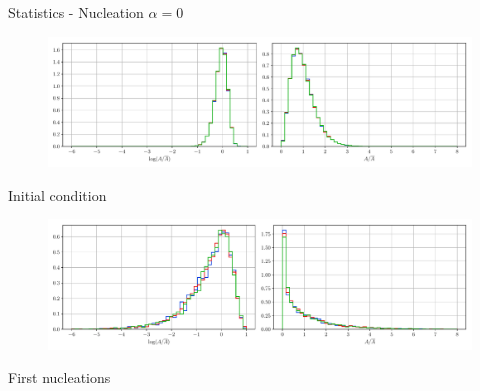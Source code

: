 \documentclass[usenames,dvipsnames]{beamer}
\begin{document}
\begin{frame}{Statistics - Nucleation $\alpha = 0$}
\small
\centering
    \vspace{-0.5em}
    \begin{figure}
        \centering
        \includegraphics[scale=0.35]{figures/stored_energy/SE/areas/000000_nuclconstant_set.pdf}
    \end{figure}
    \vspace{-1em}
    Initial condition
    \begin{figure}
        \centering
        \includegraphics[scale=0.35]{figures/stored_energy/SE/areas/000070_nuclconstant_set.pdf}
    \end{figure}
    \vspace{-1em}
    First nucleations
\end{frame}
\end{document}
